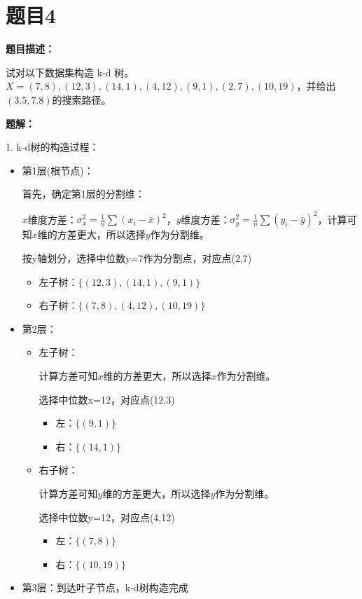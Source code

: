 \documentclass[UTF8]{ctexart}
\begin{document}
	
	\section{题目4}
	\textbf{题目描述：}
	
	试对以下数据集构造 k-d 树。$X={(7,8),(12,3),(14,1),(4,12),(9,1),(2,7),(10,19)}$，并给出$(3.5,7.8)$的搜索路径。
	
	
	\textbf{题解：}
	
	
	1. k-d树的构造过程：
	
	
	\begin{itemize}

		\item 第1层(根节点)：
		
		首先，确定第1层的分割维：
		
		$x$维度方差：$\sigma_x^2=\frac{1}{n}\sum(x_i-\bar{x})^2$，$y$维度方差：$\sigma_y^2=\frac{1}{n}\sum(y_i-\bar{y})^2$，计算可知$x$维的方差更大，所以选择$y$作为分割维。 
		
		按y轴划分，选择中位数y=7作为分割点，对应点(2,7)
		\begin{itemize}
			\item 左子树：$\{(12,3),(14,1),(9,1)\}$
			\item 右子树：$\{(7,8),(4,12),(10,19)\}$
		\end{itemize}
		
		\item 
		
		第2层：
		\begin{itemize}
			\item 左子树：
			
			计算方差可知$x$维的方差更大，所以选择$x$作为分割维。 
			
			选择中位数x=12，对应点(12,3)
			\begin{itemize}
				\item 左：$\{(9,1)\}$
				\item 右：$\{(14,1)\}$
			\end{itemize}
			\item 右子树：
			
			计算方差可知$y$维的方差更大，所以选择$y$作为分割维。 
			
			选择中位数y=12，对应点(4,12)
			\begin{itemize}
				\item 左：$\{(7,8)\}$
				\item 右：$\{(10,19)\}$
			\end{itemize}
		\end{itemize}
		
		\item 第3层：到达叶子节点，k-d树构造完成
	\end{itemize}
	
\end{document}
